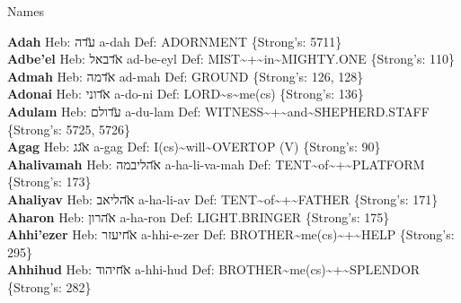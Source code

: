 {\newpage
\begin{center}
{\Large{}Names}\label{page:dictionary:names}
\end{center}

\vspace{-2ex}
\textbf{Adah} Heb: {\large\H עדה} a-dah Def: ADORNMENT \{Strong's: 5711\}\hfill{}\\

\textbf{Adbe'el} Heb: {\large\H אדבאל} ad-be-eyl Def: MIST\textasciitilde{}+\textasciitilde{}in\textasciitilde{}MIGHTY.ONE \{Strong's: 110\}\hfill{}\\

\textbf{Admah} Heb: {\large\H אדמה} ad-mah Def: GROUND \{Strong's: 126, 128\}\hfill{}\\

\textbf{Adonai} Heb: {\large\H אדוני} a-do-ni Def: LORD\textasciitilde{}s\textasciitilde{}me(cs) \{Strong's: 136\}\hfill{}\\

\textbf{Adulam} Heb: {\large\H עדולם} a-du-lam Def: WITNESS\textasciitilde{}+\textasciitilde{}and\textasciitilde{}SHEPHERD.STAFF \{Strong's: 5725, 5726\}\hfill{}\\

\textbf{Agag} Heb: {\large\H אגג} a-gag Def: I(cs)\textasciitilde{}will\textasciitilde{}OVERTOP (V) \{Strong's: 90\}\hfill{}\\

\textbf{Ahalivamah} Heb: {\large\H אהליבמה} a-ha-li-va-mah Def: TENT\textasciitilde{}of\textasciitilde{}+\textasciitilde{}PLATFORM \{Strong's: 173\}\hfill{}\\

\textbf{Ahaliyav} Heb: {\large\H אהליאב} a-ha-li-av Def: TENT\textasciitilde{}of\textasciitilde{}+\textasciitilde{}FATHER \{Strong's: 171\}\hfill{}\\

\textbf{Aharon} Heb: {\large\H אהרון} a-ha-ron Def: LIGHT.BRINGER \{Strong's: 175\}\hfill{}\\

\textbf{Ahhi'ezer} Heb: {\large\H אחיעזר} a-hhi-e-zer Def: BROTHER\textasciitilde{}me(cs)\textasciitilde{}+\textasciitilde{}HELP \{Strong's: 295\}\hfill{}\\

\textbf{Ahhihud} Heb: {\large\H אחיהוד} a-hhi-hud Def: BROTHER\textasciitilde{}me(cs)\textasciitilde{}+\textasciitilde{}SPLENDOR \{Strong's: 282\}\hfill{}\\

}
